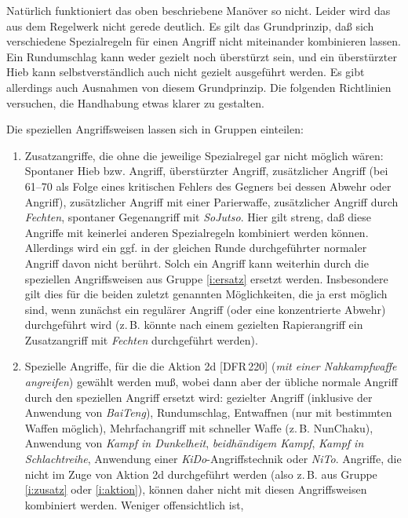 \documentclass[10pt,a4paper,germanpar]{article}
\begin{document}
Natürlich funktioniert das oben beschriebene Manöver so nicht. Leider
wird das aus dem Regelwerk nicht gerede deutlich. Es gilt das
Grundprinzip, daß sich verschiedene Spezialregeln für einen Angriff
nicht miteinander kombinieren lassen. Ein Rundumschlag kann weder
gezielt noch überstürzt sein, und ein überstürzter Hieb kann
selbstverständlich auch nicht gezielt ausgeführt werden. Es gibt
allerdings auch Ausnahmen von diesem Grundprinzip. Die folgenden
Richtlinien versuchen, die Handhabung etwas klarer zu gestalten.

Die speziellen Angriffsweisen lassen sich in Gruppen einteilen:

\begin{enumerate}
\item \label{i:zusatz} Zusatzangriffe, die ohne die jeweilige
  Spezialregel gar nicht möglich wären: Spontaner Hieb bzw. Angriff,
  überstürzter Angriff, zusätzlicher Angriff (bei 61--70 als Folge
  eines kritischen Fehlers des Gegners bei dessen Abwehr oder
  Angriff), zusätzlicher Angriff mit einer Parierwaffe, zusätzlicher
  Angriff durch \emph{Fechten}, spontaner Gegenangriff mit
  \emph{SoJutso}. Hier gilt streng, daß diese Angriffe mit keinerlei
  anderen Spezialregeln kombiniert werden können. Allerdings wird ein
  ggf. in der gleichen Runde durchgeführter normaler Angriff davon
  nicht berührt. Solch ein Angriff kann weiterhin durch die speziellen
  Angriffsweisen aus Gruppe \ref{i:ersatz} ersetzt
  werden. Insbesondere gilt dies für die beiden zuletzt genannten
  Möglichkeiten, die ja erst möglich sind, wenn zunächst ein regulärer
  Angriff (oder eine konzentrierte Abwehr) durchgeführt wird
  (z.\,B. könnte nach einem gezielten Rapierangriff ein Zusatzangriff
  mit \emph{Fechten} durchgeführt werden).
\item \label{i:ersatz} Spezielle Angriffe, für die die Aktion 2d
  [DFR\,220] (\emph{mit einer Nahkampfwaffe angreifen}) gewählt werden
  muß, wobei dann aber der übliche normale Angriff durch den
  speziellen Angriff ersetzt wird: gezielter Angriff (inklusive der
  Anwendung von \emph{BaiTeng}), Rundumschlag, Entwaffnen (nur mit
  bestimmten Waffen möglich), Mehrfachangriff mit schneller Waffe
  (z.\,B. NunChaku), Anwendung von \emph{Kampf in Dunkelheit},
  \emph{beidhändigem Kampf}, \emph{Kampf in Schlachtreihe}, Anwendung
  einer \emph{KiDo}-Angriffstechnik oder \emph{NiTo}. Angriffe, die
  nicht im Zuge von Aktion 2d durchgeführt werden (also z.\,B. aus
  Gruppe \ref{i:zusatz} oder \ref{i:aktion}), können daher nicht mit
  diesen Angriffsweisen kombiniert werden. Weniger offensichtlich ist,

\end{enumerate}
\end{document}
